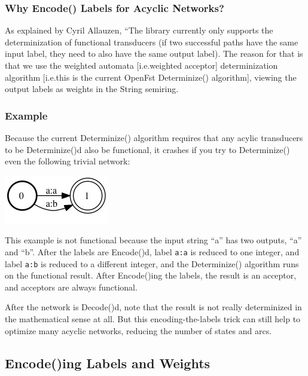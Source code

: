 \documentclass[letterpaper,12pt]{article}
\begin{document}
\subsubsection{Why Encode() Labels for Acyclic Networks?}

As explained by Cyril Allauzen, ``The library currently only supports the determinization of functional  
transducers (if two successful paths have the same input label, they  
need to also have the same output label). The reason for that is that  
we use the weighted automata [i.e.\@ weighted acceptor]
determinization algorithm [i.e.\@ this is the current OpenFst
Determinize() algorithm], viewing the  
output labels as weights in the String semiring.

\subsubsection{Example}

Because the current Determinize() algorithm requires that any acylic
transducers to be Determinize()d also be
functional, it crashes if you try to Determinize() even the following trivial network:

\begin{center}
\includegraphics[scale=0.5]{images/aab.jpg}
\end{center}

\noindent
This example is not functional because the input string ``a'' has two outputs,
``a'' and ``b''.  After the labels are Encode()d, label \texttt{a:a} is reduced to
one integer, and label \texttt{a:b} is reduced to a different integer, and the
Determinize() algorithm runs on the functional result.  After Encode()ing the
labels, the result is an acceptor, and acceptors are always functional.

After the network is Decode()d, note that the result is not really
determinized in the mathematical sense at
all.  But this encoding-the-labels trick can still help to optimize many acyclic
networks, reducing the number of states and arcs.

\subsection{Encode()ing Labels and Weights}
\end{document}
